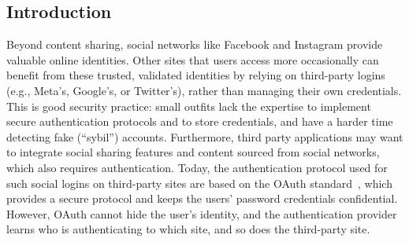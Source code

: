 \documentclass[10pt]{article}
\date{}							%
\begin{document}


\subsection*{Introduction}
Beyond content sharing, social networks like Facebook and Instagram provide valuable online identities. Other sites that users access more occasionally can benefit from these trusted, validated identities by relying on third-party logins (e.g., Meta’s, Google’s, or Twitter’s), rather than managing their own credentials. This is good security practice: small outfits lack the expertise to implement secure authentication protocols and to store credentials, and have a harder time detecting fake (“sybil”) accounts. Furthermore, third party applications may want to integrate social sharing features and content sourced from social networks, which also requires authentication. Today, the authentication protocol used for such social logins on third-party sites are based on the OAuth standard~\cite{oauth}, which provides a secure protocol and keeps the users’ password credentials confidential. However, OAuth cannot hide the user’s identity, and the authentication provider learns who is authenticating to which site, and so does the third-party site.
\end{document}
